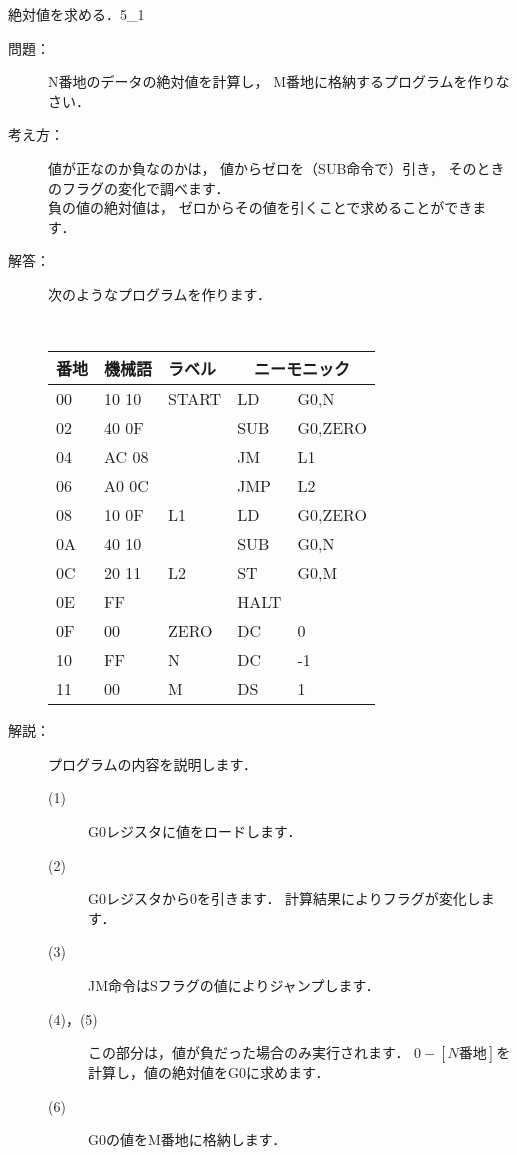 \newpage
\begin{reidai}{絶対値を求める．}{5_1}
\begin{description}

\item[問題：]
N番地のデータの絶対値を計算し，
M番地に格納するプログラムを作りなさい．

\item[考え方：]
値が正なのか負なのかは，
値からゼロを（SUB命令で）引き，
そのときのフラグの変化で調べます．\\
負の値の絶対値は，
ゼロからその値を引くことで求めることができます．

\item[解答：]次のようなプログラムを作ります．

\begin{center}
\end{center}

\begin{center}
{\footnotesize\tt
\begin{tabular}{|l|l|l|l l|}
\hline
番地 & 機械語 & ラベル & \multicolumn{2}{|c|}{ニーモニック} \\
\hline
00 & 10 10 & START& LD   & G0,N    \\
02 & 40 0F &      & SUB  & G0,ZERO \\
04 & AC 08 &      & JM   & L1      \\
06 & A0 0C &      & JMP  & L2      \\
08 & 10 0F & L1   & LD   & G0,ZERO \\
0A & 40 10 &      & SUB  & G0,N    \\
0C & 20 11 & L2   & ST   & G0,M    \\
0E & FF    &      & HALT &         \\
0F & 00    & ZERO & DC   & 0       \\
10 & FF    & N    & DC   & -1      \\
11 & 00    & M    & DS   & 1       \\
\hline
\end{tabular}
}
\end{center}

\item[解説：]プログラムの内容を説明します．
{\small
\begin{description}
\item[(1)] G0レジスタに値をロードします．
\item[(2)] G0レジスタから0を引きます．
計算結果によりフラグが変化します．
\item[(3)] JM命令はSフラグの値によりジャンプします．
\item[(4)，(5)] この部分は，値が負だった場合のみ実行されます．
$0 - [N番地]$を計算し，値の絶対値をG0に求めます．
\item[(6)] G0の値をM番地に格納します．
\end{description}
}

\end{description}
\end{reidai}

